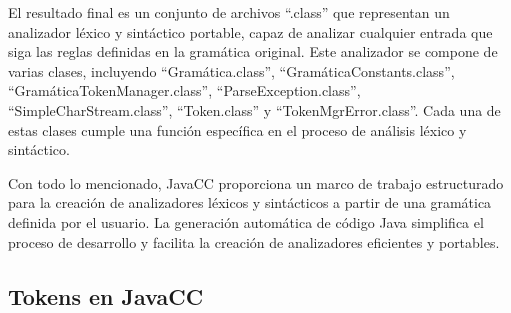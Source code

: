 El resultado final es un conjunto de archivos ``.class'' que representan un analizador léxico y sintáctico portable, capaz de analizar cualquier entrada que siga las reglas definidas en la gramática original. Este analizador se compone de varias clases, incluyendo ``Gramática.class'', ``GramáticaConstants.class'', ``GramáticaTokenManager.class'', ``ParseException.class'', ``SimpleCharStream.class'', ``Token.class'' y ``TokenMgrError.class''. Cada una de estas clases cumple una función específica en el proceso de análisis léxico y sintáctico.

Con todo lo mencionado, JavaCC proporciona un marco de trabajo estructurado para la creación de analizadores léxicos y sintácticos a partir de una gramática definida por el usuario. La generación automática de código Java simplifica el proceso de desarrollo y facilita la creación de analizadores eficientes y portables.

\subsection{Tokens en JavaCC}
\label{sec:tokensenjavacc}








